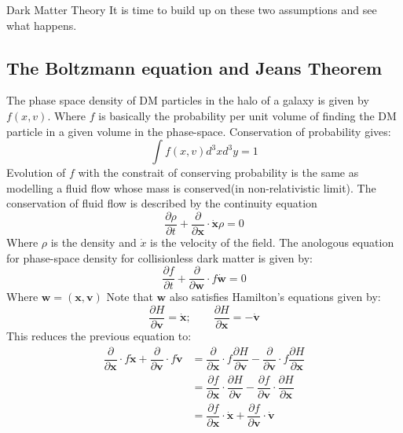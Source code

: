 \documentclass[10pt,a4paper]{book}
\begin{document}
\begin{chapter}{Dark Matter Theory}
		It is time to build up on these two assumptions and see what happens. 
		
		\subsection{The Boltzmann equation and Jeans Theorem}
		
		
		The phase space density of DM particles in the halo of a galaxy is given by $f(x,v)$. Where $f$ is basically the probability per unit volume of finding the DM particle in a given volume in the phase-space. Conservation of probability gives: 
		\begin{equation}
		\int f(x,v)d^3x d^3y = 1
		\end{equation}
		Evolution of $f$ with the constrait of conserving probability is the same as modelling a fluid flow whose mass is conserved(in non-relativistic limit). The conservation of fluid flow is described by the continuity equation\cite{BandT}
		\begin{equation}
		\dfrac{\partial \rho}{\partial t} + \dfrac{\partial}{\partial \mathbf{x}}\cdot \dot{\mathbf{x}}\rho = 0
		\end{equation}
		Where $\rho$ is the density and $\dot{x}$ is the velocity of the field. The anologous equation for phase-space density for collisionless dark matter is given by:
		\begin{equation}
		\dfrac{\partial f}{\partial t} + \dfrac{\partial}{\partial \mathbf{w}}\cdot f\mathbf{\dot{w}} = 0 
		\end{equation}
		Where $\mathbf{w} = (\mathbf{x},\mathbf{v})$
		Note that $\mathbf{w}$ also satisfies Hamilton's equations given by:
		\begin{equation}
		\dfrac{\partial H}{\partial \mathbf{v} } = \mathbf{\dot{x}}; \qquad	 \dfrac{\partial H}{\partial \mathbf{x} } = -\mathbf{\dot{v}} 
		\end{equation} 
		This reduces the previous equation to:
		\begin{align}
		\dfrac{\partial}{\partial \mathbf{x}}\cdot f\mathbf{\dot{x}} + \dfrac{\partial}{\partial \mathbf{v}}\cdot f\mathbf{\dot{v}} &=  \dfrac{\partial}{\partial \mathbf{x}}\cdot f\dfrac{\partial H}{\partial \mathbf{v} } - \dfrac{\partial}{\partial \mathbf{v}}\cdot f\dfrac{\partial H}{\partial \mathbf{x} } \\
		& = \dfrac{\partial f}{\partial \mathbf{x}}\cdot \dfrac{\partial H}{\partial \mathbf{v} } - \dfrac{\partial f}{\partial \mathbf{v}}\cdot \dfrac{\partial H}{\partial \mathbf{x} } \\
		&= \dfrac{\partial f}{\partial \mathbf{x}}\cdot \mathbf{\dot{x}} + \dfrac{\partial f}{\partial \mathbf{v}}\cdot \mathbf{\dot{v}} 
		\end{align}
		

\end{chapter}
\end{document}
